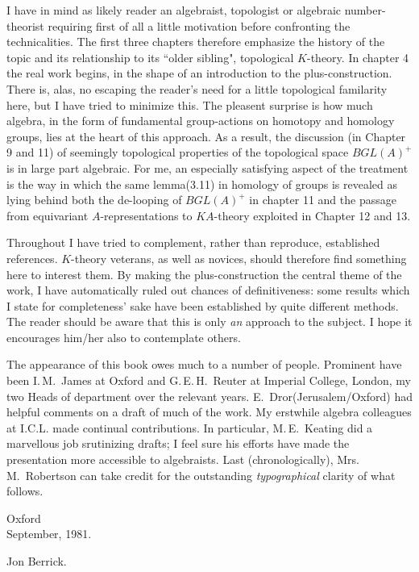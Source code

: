 \documentclass[openany,leqno]{book}  %
\begin{document}
I have in mind as likely reader an algebraist, topologist or algebraic number-theorist requiring first of all a little motivation before confronting the technicalities. The first three chapters therefore emphasize the history of the topic and its relationship to its ``older sibling", topological $K$-theory. In chapter 4 the real work begins, in the shape of an introduction to the plus-construction. There is, alas, no escaping the reader's need for a little topological familarity here, but I have tried to minimize this. The pleasent surprise is how much algebra, in the form of fundamental group-actions on homotopy and homology groups, lies at the heart of this approach. As a result, the discussion (in Chapter 9 and 11) of seemingly topological properties of the topological space $BGL(A)^+$ is in large part algebraic. For me, an especially satisfying aspect of the treatment is the way in which the same lemma(3.11) in homology of groups is revealed as lying behind both the de-looping of $BGL(A)^+$ in chapter 11 and the passage from equivariant $A$-representations to $KA$-theory exploited in Chapter 12 and 13. 

Throughout I have tried to complement, rather than reproduce, established references. $K$-theory veterans, as well as novices, should therefore find something here to interest them. By making the plus-construction the central theme of the work, I have automatically ruled out chances of definitiveness: some results which I state for completeness' sake have been established by quite different methods. The reader should be aware that this is only {\em an} approach to the subject. I hope it encourages him/her also to contemplate others. 

The appearance of this book owes much to a number of people. Prominent have been I.\,M.~James at Oxford and G.\,E.\,H.~Reuter at Imperial College, London, my two Heads of department over the relevant years. E.~Dror(Jerusalem/Oxford) had helpful comments on a draft of much of the work. My erstwhile algebra colleagues at I.C.L. made continual contributions. In particular, M.\,E.~Keating did a marvellous job srutinizing drafts; I feel sure his efforts have made the presentation more accessible to algebraists. Last (chronologically), Mrs. M.~Robertson can take credit for the outstanding {\em typographical} clarity of what follows.


\noindent Oxford\\
September, 1981. \\
{\begin{flushright}
  Jon Berrick.
\end{flushright}} 
\end{document}
